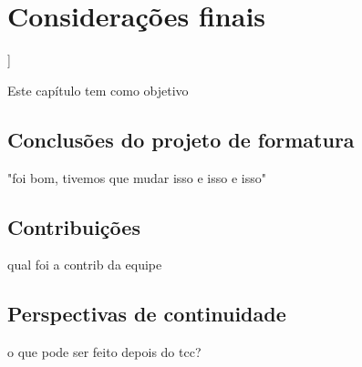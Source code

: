 \chapter{Considerações finais}]
\label{CAP6}


Este capítulo tem como objetivo 


\section{Conclusões do projeto de formatura}
"foi bom, tivemos que mudar isso e isso e isso"

\section{Contribuições}
qual foi a contrib da equipe

\section{Perspectivas de continuidade}
o que pode ser feito depois do tcc?